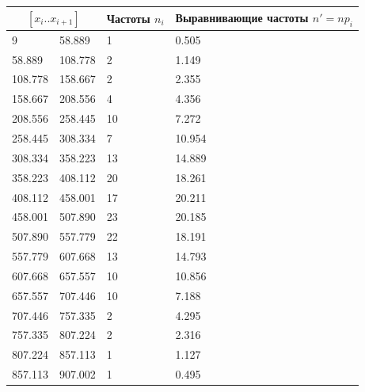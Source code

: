 \begin{table}[H]
    \begin{center}
        \begin{tabular}{|l|l|l|l|}
            \hline
            \multicolumn{2}{|c|}{$[x_{i}..x_{i+1}]$} & Частоты $n_{i}$ & Выравнивающие частоты $n{}' = np_{i}$ \\
            \hline
            9       & 58.889  & 1  & 0.505  \\
            \hline
            58.889  & 108.778 & 2  & 1.149  \\
            \hline
            108.778 & 158.667 & 2  & 2.355  \\
            \hline
            158.667 & 208.556 & 4  & 4.356  \\
            \hline
            208.556 & 258.445 & 10 & 7.272  \\
            \hline
            258.445 & 308.334 & 7  & 10.954 \\
            \hline
            308.334 & 358.223 & 13 & 14.889 \\
            \hline
            358.223 & 408.112 & 20 & 18.261 \\
            \hline
            408.112 & 458.001 & 17 & 20.211 \\
            \hline
            458.001 & 507.890 & 23 & 20.185 \\
            \hline
            507.890 & 557.779 & 22 & 18.191 \\
            \hline
            557.779 & 607.668 & 13 & 14.793 \\
            \hline
            607.668 & 657.557 & 10 & 10.856 \\
            \hline
            657.557 & 707.446 & 10 & 7.188  \\
            \hline
            707.446 & 757.335 & 2  & 4.295  \\
            \hline
            757.335 & 807.224 & 2  & 2.316  \\
            \hline
            807.224 & 857.113 & 1  & 1.127  \\
            \hline
            857.113 & 907.002 & 1  & 0.495  \\
            \hline
        \end{tabular}
    \end{center}
\end{table}

